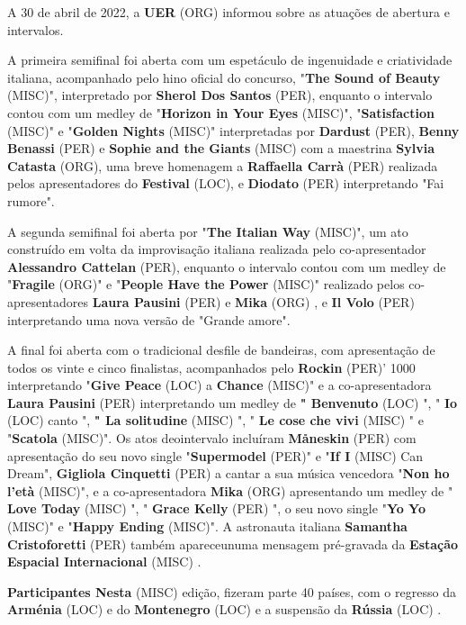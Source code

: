 \documentclass[12pt,a4paper]{article}
\begin{document}
A 30 de abril de 2022, a \textbf{UER} (ORG) informou sobre as atuações de abertura e intervalos.

A primeira semifinal foi aberta com um espetáculo de ingenuidade e criatividade italiana, acompanhado pelo hino oficial do concurso, "\textbf{The Sound of Beauty} (MISC)", interpretado por \textbf{Sherol Dos Santos} (PER), enquanto o intervalo contou com um medley de "\textbf{Horizon in Your Eyes} (MISC)", "\textbf{Satisfaction} (MISC)" e "\textbf{Golden Nights} (MISC)" interpretadas por \textbf{Dardust} (PER), \textbf{Benny Benassi} (PER) e \textbf{Sophie and the Giants} (MISC) com a maestrina \textbf{Sylvia Catasta} (ORG), uma breve homenagem a \textbf{Raffaella Carrà} (PER) realizada pelos apresentadores do \textbf{Festival} (LOC), e \textbf{Diodato} (PER) interpretando "Fai rumore".

A segunda semifinal foi aberta por "\textbf{The Italian Way} (MISC)", um ato construído em volta da improvisação italiana realizada pelo co-apresentador \textbf{Alessandro Cattelan} (PER), enquanto o intervalo contou com um medley de "\textbf{Fragile} (ORG)" e "\textbf{People Have the Power} (MISC)" realizado pelos co-apresentadores \textbf{Laura Pausini} (PER) e \textbf{Mika} (ORG) , e \textbf{Il Volo} (PER) interpretando uma nova versão de "Grande amore".

A final foi aberta com o tradicional desfile de bandeiras, com apresentação de todos os vinte e cinco finalistas, acompanhados pelo \textbf{Rockin} (PER)' 1000 interpretando "\textbf{Give Peace} (LOC) a \textbf{Chance} (MISC)" e a co-apresentadora \textbf{Laura Pausini} (PER) interpretando um medley de \textbf{" Benvenuto} (LOC) ", " \textbf{Io} (LOC) canto ", \textbf{" La solitudine} (MISC) ", " \textbf{Le cose che vivi} (MISC) " e "\textbf{Scatola} (MISC)". Os atos deointervalo incluíram \textbf{Måneskin} (PER) com apresentação do seu novo single "\textbf{Supermodel} (PER)" e "\textbf{If I} (MISC) Can Dream", \textbf{Gigliola Cinquetti} (PER) a cantar a sua música vencedora "\textbf{Non ho l'età} (MISC)", e a co-apresentadora \textbf{Mika} (ORG) apresentando um medley de " \textbf{Love Today} (MISC) ", " \textbf{Grace Kelly} (PER) ", o seu novo single "\textbf{Yo Yo} (MISC)" e "\textbf{Happy Ending} (MISC)". A astronauta italiana \textbf{Samantha Cristoforetti} (PER) também apareceunuma mensagem pré-gravada da \textbf{Estação Espacial Internacional} (MISC) .



\textbf{Participantes Nesta} (MISC) edição, fizeram parte 40 países, com o regresso da \textbf{Arménia} (LOC) e do \textbf{Montenegro} (LOC) e a suspensão da \textbf{Rússia} (LOC) .
\end{document}
